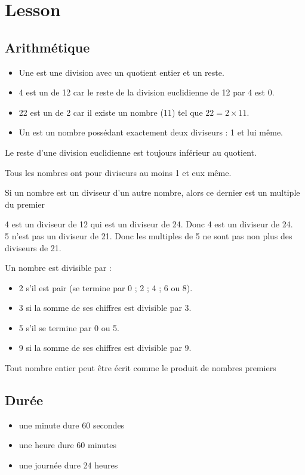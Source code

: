 \section{Lesson}
\subsection{Arithmétique}
\dfnt
{
	\begin{itemize}
		\item Une  est une division avec un quotient entier et un reste.
		\item 4 est un  de 12 car le reste de la division euclidienne de 12 par 4 est 0.
		\item 22 est un  de 2 car il existe un nombre (11) tel que $22=2\times11$.
		\item Un  est un nombre possédant exactement deux diviseurs : 1 et lui même.
	\end{itemize}
}

{
	Le reste d'une division euclidienne est toujours inférieur au quotient.
}



{
	Tous les nombres ont pour diviseurs au moins 1 et eux même.
}



{Si un nombre est un diviseur d'un autre nombre, alors ce dernier est un multiple du premier}

{
	4 est un diviseur de 12 qui est un diviseur de 24. Donc 4 est un diviseur de 24.
	\\
	5 n'est pas un diviseur de 21. Donc les multiples de 5 ne sont pas non plus des diviseurs de 21.
}



{Un nombre est divisible par :
\begin{itemize}
	\item 2 s'il est pair (se termine par 0 ; 2 ; 4 ; 6 ou 8).
	\item 3 si la somme de ses chiffres est divisible par 3.
	\item 5 s'il se termine par 0 ou 5.
	\item 9 si la somme de ses chiffres est divisible par 9.
\end{itemize}
}

{
	Tout nombre entier peut être écrit comme le produit de nombres premiers
}

\subsection{Durée}

{
	\begin{itemize}
	\item une minute dure 60 secondes
	\item une heure dure 60 minutes
	\item une journée dure 24 heures
	\end{itemize}
}

